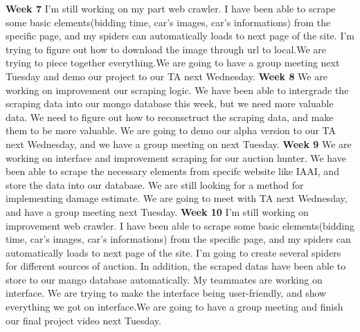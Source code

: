 \documentclass[onecolumn, draftclsnofoot, 10pt, compsoc]{IEEEtran}
\begin{document}
\newline
\textbf{Week 7}
I'm still working on my part web crawler.  I have been able to scrape some basic elements(bidding time, car's images, car's informations) from the specific page, and my spiders can automatically loads to next page of the site. I'm trying to figure out how to download the image through url to local.We are trying to piece together everything.We are going to have a group meeting next Tuesday and demo our project to our TA next Wednesday.  
\newline
\textbf{Week 8}
We are working on improvement our scraping logic. We have been able to intergrade the scraping data into our mongo database this week, but we need more valuable data. We need to figure out how to reconsctruct the scraping data, and make them to be more valuable. We are going to demo our alpha version to our TA next Wednesday, and we have a group meeting on next Tuesday.
\newline
\textbf{Week 9}
We are working on interface and improvement scraping for our auction hunter. We have been able to scrape the necessary elements from specifc website like IAAI, and store the data into our database. We are still looking for a method for implementing damage estimate. We are going to meet with TA next Wednesday, and have a group meeting next Tuesday.
\newline
\textbf{Week 10}
I'm still working on improvement web crawler.  I have been able to scrape some basic elements(bidding time, car's images, car's informations) from the specific page, and my spiders can automatically loads to next page of the site. I'm going to create several spiders for different sources of auction. In addition, the scraped datas have been able to store to our mango database automatically. My teammates are working on interface. We are trying to make the interface being user-friendly, and show everything we got on interface.We are going to have a group meeting and finish our final project video next Tuesday.
\end{document}
